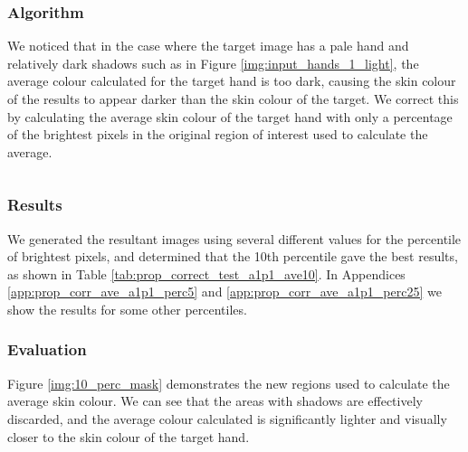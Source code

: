 \subsubsection*{Algorithm}
We noticed that in the case where the target image has a pale hand and relatively dark shadows such as in Figure \ref{img:input_hands_1_light}, the average colour calculated for the target hand is too dark, causing the skin colour of the results to appear darker than the skin colour of the target. We correct this by calculating the average skin colour of the target hand with only a percentage of the brightest pixels in the original region of interest used to calculate the average. 

\begin{equation} \label{eq:prop_corr_ave_algo}
\end{equation}

\subsubsection*{Results}
We generated the resultant images using several different values for the percentile of brightest pixels, and determined that the 10th percentile gave the best results, as shown in Table \ref{tab:prop_correct_test_a1p1_ave10}. In Appendices \ref{app:prop_corr_ave_a1p1_perc5} and \ref{app:prop_corr_ave_a1p1_perc25} we show the results for some other percentiles.



\subsubsection*{Evaluation}
Figure \ref{img:10_perc_mask} demonstrates the new regions used to calculate the average skin colour. We can see that the areas with shadows are effectively discarded, and the average colour calculated is significantly lighter and visually closer to the skin colour of the target hand. 


